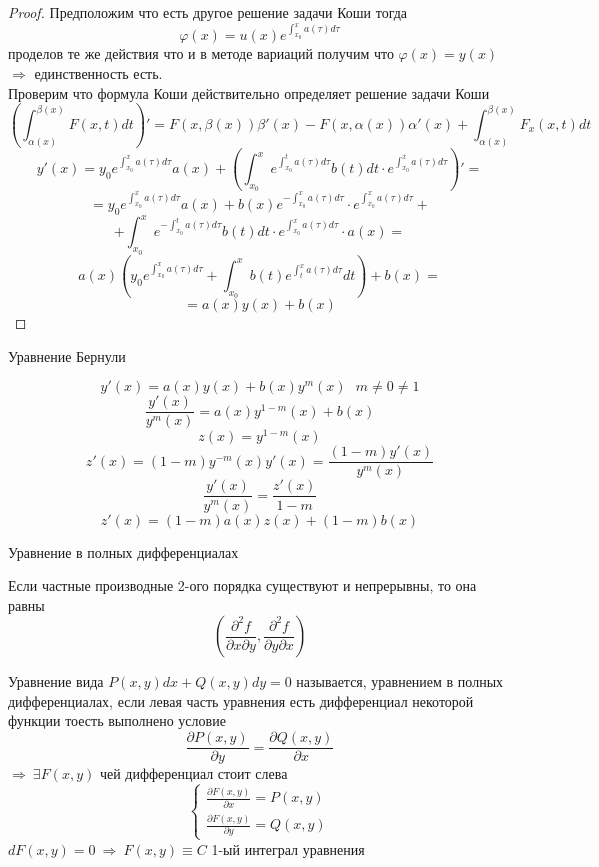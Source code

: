 \begin{proof}
  Предположим что есть другое решение задачи Коши тогда
  $$
  \varphi(x) = u(x) e^{\int_{x_0}^x a(\tau)d\tau}
  $$
  проделов те же действия что и в методе вариаций получим что
  $\varphi(x) = y(x)$ $\Rightarrow$ единственность есть. \\

  Проверим что формула Коши действительно определяет решение задачи Коши
  $$
  \left( \int_{\alpha(x)}^{\beta(x)} F(x, t) dt \right)' =
  F(x, \beta(x)) \beta'(x) - F(x, \alpha(x)) \alpha'(x) +
  \int_{\alpha(x)}^{\beta(x)} F_x(x, t)dt
  $$
  $$
  y'(x) = y_0 e^{\int_{x_0}^x a(\tau) d\tau} a(x) + \left( \int_{x_0}^x
  e^{\int_{x_0}^t a(\tau) d\tau} b(t)dt \cdot
  e^{\int_{x_0}^x a(\tau)d\tau} \right)' =
  $$
  $$
  = y_0 e^{\int_{x_0}^x a(\tau)d\tau} a(x) + b(x)
  e^{-\int_{x_0}^x a(\tau) d\tau} \cdot e^{\int_{x_0}^x a(\tau) d\tau} +
  $$
  $$
  + \int_{x_0}^x e^{-\int_{x_0}^t a(\tau) d\tau} b(t) dt \cdot
  e^{\int_{x_0}^x a(\tau) d\tau} \cdot a(x)=
  $$
  $$
  a(x) \left( y_0 e^{\int_{x_0}^x a(\tau) d\tau} + \int_{x_0}^x b(t)
  e^{\int_t^x a(\tau) d\tau} dt \right) + b(x) =
  $$
  $$
  = a(x)y(x) + b(x)
  $$
\end{proof}

\begin{title}[\Large]
  Уравнение Бернули
\end{title}

\begin{block}
  $$
  y'(x) = a(x)y(x) + b(x)y^m(x) ~~~ m \not= 0 \not= 1
  $$
  $$
  \frac{y'(x)}{y^m(x)} = a(x) y^{1 - m}(x) + b(x)
  $$
  $$
  z(x) = y^{1 - m}(x)
  $$
  $$
  z'(x) = (1 - m) y^{-m}(x) y'(x) = \frac{(1-m)y'(x)}{y^m(x)}
  $$
  $$
  \frac{y'(x)}{y^m(x)} = \frac{z'(x)}{1 - m}
  $$
  $$
  z'(x) = (1 - m) a(x)z(x) + (1 - m)b(x)
  $$
\end{block}

\begin{title}[\Large]
  Уравнение в полных дифференциалах
\end{title}

Если частные производные 2-ого порядка существуют и непрерывны, то она равны
$$
\left( \frac{\partial^2 f}{\partial x \partial y},
\frac{\partial^2 f}{\partial y \partial x} \right)
$$

\begin{define}
  Уравнение вида $P(x, y)dx + Q(x, y)dy = 0$ называется, уравнением в полных
  дифференциалах, если левая часть уравнения есть дифференциал некоторой
  функции тоесть выполнено условие
  $$
  \frac{\partial P(x, y)}{\partial y} = \frac{\partial Q(x, y)}{\partial x}
  $$
  $\Rightarrow ~ \exists F(x, y)$ чей дифференциал стоит слева
  $$
  \left\{
  \begin{array}{l}
    \frac{\partial F(x, y)}{\partial x} = P(x, y) \\
    \frac{\partial F(x, y)}{\partial y} = Q(x, y)
  \end{array}
  \right.
  $$
  $dF(x, y) = 0 ~ \Rightarrow ~ F(x, y) \equiv C$ 1-ый интеграл уравнения
\end{define}

